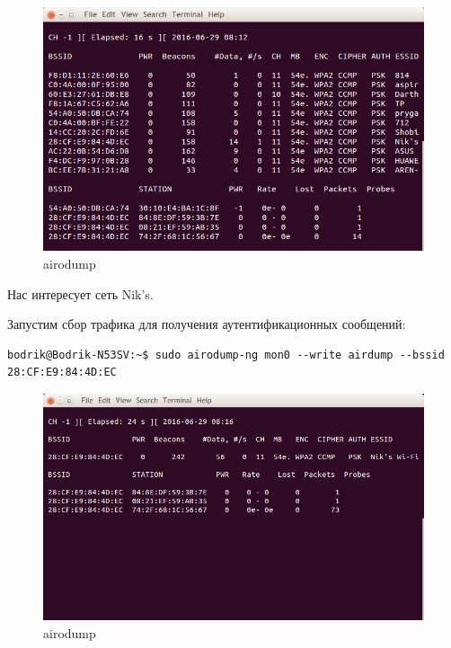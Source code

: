 \begin{figure}[H]
	\centering
	\includegraphics[width=\textwidth]{images/1.png}
	\caption{airodump}
\end{figure}

Нас интересует сеть Nik's.

Запустим сбор трафика для получения аутентификационных сообщений:

\begin{lstlisting}
bodrik@Bodrik-N53SV:~$ sudo airodump-ng mon0 --write airdump --bssid 28:CF:E9:84:4D:EC
\end{lstlisting}

\begin{figure}[H]
	\centering
	\includegraphics[width=\textwidth]{images/2.png}
	\caption{airodump}
\end{figure}

